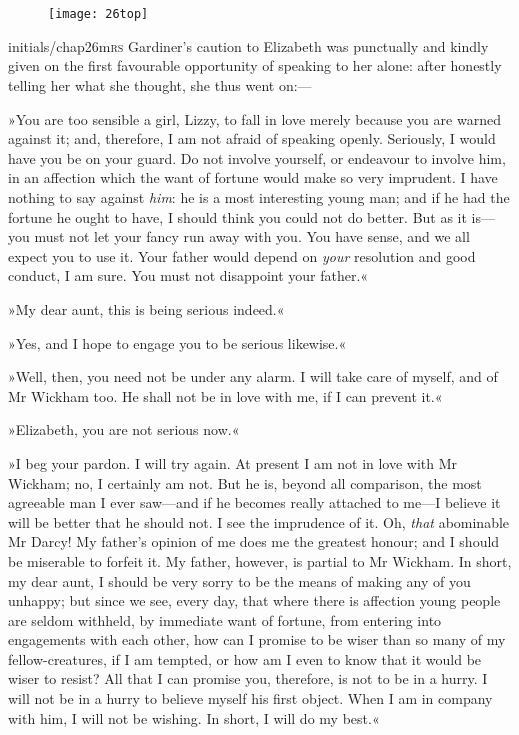 \chapter[Chapter \thechapter]{}
	
\begin{figure}[t!]
\centering
\texttt{[image: 26top]}
\end{figure}


\lettrine[lines=6,image=true]{initials/chap26m}{rs}  Gardiner's caution to Elizabeth was punctually and kindly given on the first favourable opportunity of speaking to her alone: after honestly telling her what she thought, she thus went on:—

\zz
»You are too sensible a girl, Lizzy, to fall in love merely because you are warned against it; and, therefore, I am not afraid of speaking openly. Seriously, I would have you be on your guard. Do not involve yourself, or endeavour to involve him, in an affection which the want of fortune would make so very imprudent. I have nothing to say against \textit{him}: he is a most interesting young man; and if he had the fortune he ought to have, I should think you could not do better. But as it is—you must not let your fancy run away with you. You have sense, and we all expect you to use it. Your father would depend on \textit{your} resolution and good conduct, I am sure. You must not disappoint your father.«

»My dear aunt, this is being serious indeed.«

»Yes, and I hope to engage you to be serious likewise.«

»Well, then, you need not be under any alarm. I will take care of myself, and of Mr Wickham too. He shall not be in love with me, if I can prevent it.«

»Elizabeth, you are not serious now.«

»I beg your pardon. I will try again. At present I am not in love with Mr Wickham; no, I certainly am not. But he is, beyond all comparison, the most agreeable man I ever saw—and if he becomes really attached to me—I believe it will be better that he should not. I see the imprudence of it. Oh, \textit{that} abominable Mr Darcy! My father's opinion of me does me the greatest honour; and I should be miserable to forfeit it. My father, however, is partial to Mr Wickham. In short, my dear aunt, I should be very sorry to be the means of making any of you unhappy; but since we see, every day, that where there is affection young people are seldom withheld, by immediate want of fortune, from entering into engagements with each other, how can I promise to be wiser than so many of my fellow-creatures, if I am tempted, or how am I even to know that it would be wiser to resist? All that I can promise you, therefore, is not to be in a hurry. I will not be in a hurry to believe myself his first object. When I am in company with him, I will not be wishing. In short, I will do my best.«

